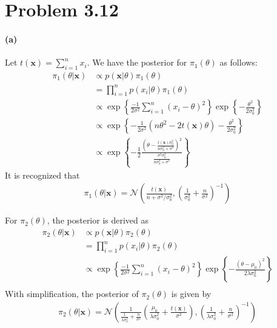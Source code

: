 \section{Problem 3.12}
\paragraph{(a)}
Let $t(\bm{x}) = \sum_{i=1}^{n}x_i$. We have the posterior for $\pi_1(\theta)$ as follows:
\begin{align*}
    \pi_1(\theta \vert \bm{x})
    &\propto p(\bm{x} \vert \theta) \pi_1(\theta) \\
    &= \prod_{i=1}^{n} p(x_i \vert \theta) \pi_1(\theta) \\
    &\propto \exp \left \{ \frac{-1}{2\sigma^2}\sum_{i=1}^n (x_i - \theta)^2  \right\}
        \exp \left\{ -\frac{\theta^2}{2\sigma_0^2}\right\} \\
    &\propto \exp \left\{ -\frac{1}{2\sigma^2} \left( n\theta^2 - 2t(\bm{x})\theta \right) 
        -\frac{\theta^2}{2\sigma_0^2} \right\}\\
    &\propto \exp \left\{ -\frac{1}{2} \frac{\left( \theta - \frac{t(\bm{x})\sigma_0^2}{n\sigma_0^2 + \sigma^2} \right)^2}{\frac{\sigma^2\sigma_0^2}{n\sigma_0^2 + \sigma^2}}
        \right\}
\end{align*}
It is recognized that
\begin{align*}
    \pi_1(\theta \vert \bm{x}) = \mathcal{N} \left(
    \frac{t(\bm{x})} {n + \sigma^2/\sigma_0^2},
    \left( \frac{1}{\sigma_0^2} + \frac{n}{\sigma^2} \right)^{-1} \right)
\end{align*}

For $\pi_2(\theta)$, the posterior is derived as
\begin{align*}
    \pi_2(\theta \vert \bm{x})
    &\propto p(\bm{x} \vert \theta) \pi_2(\theta) \\
    &= \prod_{i=1}^{n} p(x_i \vert \theta) \pi_2(\theta) \\
    &\propto \exp \left \{ \frac{-1}{2\sigma^2}\sum_{i=1}^n (x_i - \theta)^2  \right\}
    \exp \left\{ -\frac{(\theta-\mu_0)^2}{2 \lambda \sigma_0^2}\right\} \\
\end{align*}
With simplification, the posterior of $\pi_2(\theta)$ is given by
\begin{align*}
    \pi_2(\theta \vert \bm{x}) = \mathcal{N} \left(
    \frac{1}{\frac{1}{\lambda \sigma_0^2} + \frac{n}{\sigma^2}}
    \left( \frac{\mu_0}{\lambda \sigma_0^2} + \frac{t(\bm{x})}{\sigma^2} \right),
    \left( \frac{1}{\lambda \sigma_0^2} + \frac{n}{\sigma^2} \right)^{-1} \right)
\end{align*}

